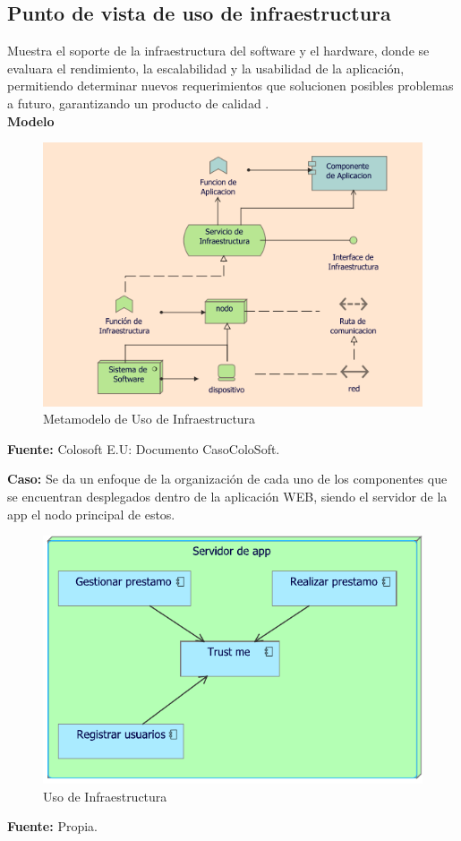 	\subsection{Punto de vista de uso de infraestructura}
	{Muestra el soporte de la infraestructura del software y el hardware, donde se evaluara el rendimiento, la escalabilidad y la usabilidad de la aplicación, permitiendo determinar nuevos requerimientos que solucionen posibles problemas a futuro, garantizando un producto de calidad \cite{archimate}.\\
		
		\textbf{Modelo}\\
		\begin{figure}[H]
			\centering
			\includegraphics[width=0.8\linewidth]{development/usoinfraestructura.png}
			\caption{Metamodelo de Uso de Infraestructura}
		\end{figure}
		\begin{center}
			\textbf{Fuente:} Colosoft E.U: Documento CasoColoSoft.
		\end{center}
		\hfill \break
		
		\textbf{Caso:} Se da un enfoque de la organización de cada uno de los componentes que se encuentran desplegados dentro de la aplicación WEB, siendo el servidor de la app el nodo principal de estos.
		
		\begin{figure}[H]
			\centering
			\includegraphics[width=0.8\linewidth]{development/usoinfraestructura.pdf}
			\caption{Uso de Infraestructura}
		\end{figure}
		\begin{center}
			\textbf{Fuente:} Propia.
		\end{center}
		\hfill \break
	}
	
